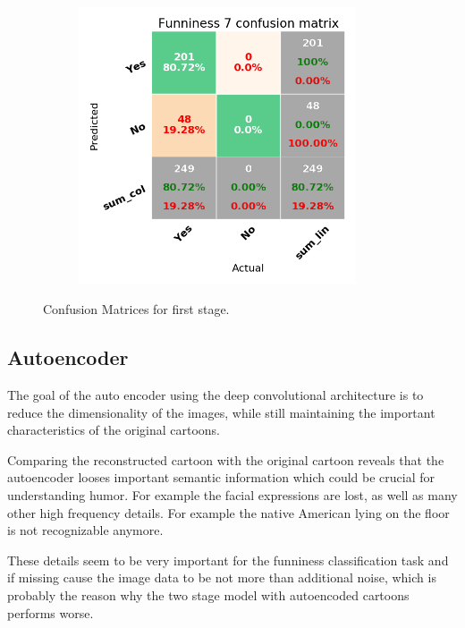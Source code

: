 \documentclass[draft,final,oneside]{vutinfth} %
\begin{document}
\begin{figure}
\begin{subfigure}[b]{0.45\textwidth}
\centering
\includegraphics[width=0.9\textwidth,height=0.3\textheight,keepaspectratio]{graphics/twostageperf/funniness7}
\end{subfigure}


\caption{Confusion Matrices for first stage.}
\label{fig:firststageconf}

\end{figure}


\subsection{Autoencoder}

The goal of the auto encoder using the deep convolutional architecture is to reduce the dimensionality of the images, while still maintaining the important characteristics of the original cartoons. 

Comparing the reconstructed cartoon with the original cartoon reveals that the autoencoder looses important semantic information which could be crucial for understanding humor. For example the facial expressions are lost, as well as many other high frequency details. For example the native American lying on the floor is not recognizable anymore. 

These details seem to be very important for the funniness classification task and if missing cause the image data to be not more than additional noise, which is probably the reason why the two stage model with autoencoded cartoons performs worse.
\end{document}
